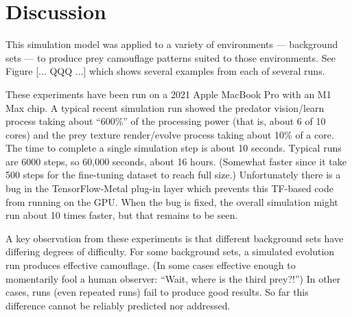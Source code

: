 \documentclass[acmtog]{acmart}
\begin{document}

\section{Discussion}
This simulation model was applied to a variety of environments — background sets — to produce prey camouflage patterns suited to those environments. See Figure [... QQQ ...] which shows several examples from each of several runs. 
\par
These experiments have been run on a 2021 Apple MacBook Pro with an M1 Max chip. A typical recent simulation run showed the predator vision/learn process taking about “600\%” of the processing power (that is, about 6 of 10 cores) and the prey texture render/evolve process taking about 10\% of a core. The time to complete a single simulation step is about 10 seconds. Typical runs are 6000 steps, so 60,000 seconds, about 16 hours. (Somewhat faster since it take 500 steps for the fine-tuning dataset to reach full size.) Unfortunately there is a bug in the TensorFlow-Metal plug-in layer which prevents this TF-based code from running on the GPU. When the bug is fixed, the overall simulation might run about 10 times faster, but that remains to be seen.
\par
A key observation from these experiments is that different background sets have differing degrees of difficulty. For some background sets, a simulated evolution run produces effective camouflage. (In some cases effective enough to momentarily fool a human observer: “Wait, where is the third prey?!”) In other cases, runs (even repeated runs) fail to produce good results. So far this difference cannot be reliably predicted nor addressed.
\par
\end{document}
